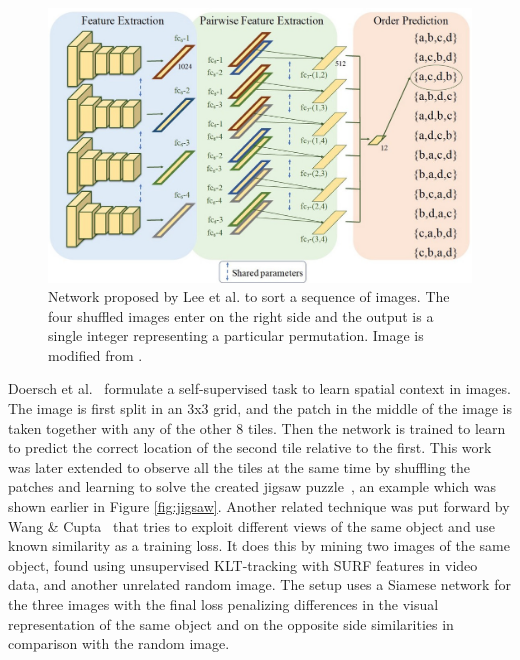\begin{figure}[t]
\centering
\includegraphics[width=\textwidth]{images/sorting_sequences.jpg}
\caption{Network proposed by Lee et al.\cite{lee2017} to sort a sequence of images. The four shuffled images enter on the right side and the output is a single integer representing a particular permutation. Image is modified from \cite{lee2017}.}
\label{fig:sorting_sequence}
\end{figure}

Doersch et al.~\cite{doersch2015} formulate a self-supervised task to learn spatial context in images. The image is first split in an 3x3 grid, and the patch in the middle of the image is taken together with any of the other 8 tiles. Then the network is trained to learn to predict the correct location of the second tile relative to the first. This work was later extended to observe all the tiles at the same time by shuffling the patches and learning to solve the created jigsaw puzzle~\cite{noroozi2016}, an example which was shown earlier in Figure \ref{fig:jigsaw}. Another related technique was put forward by Wang \& Cupta~\cite{wang2015} that tries to exploit different views of the same object and use known similarity as a training loss. It does this by mining two images of the same object, found using unsupervised KLT-tracking with SURF features in video data, and another unrelated random image. The setup uses a Siamese network for the three images with the final loss penalizing differences in the visual representation of the same object and on the opposite side similarities in comparison with the random image.

